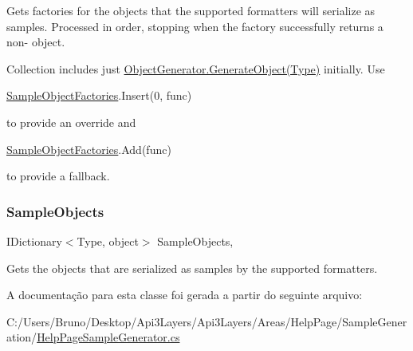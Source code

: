 Gets factories for the objects that the supported formatters will serialize as samples. Processed in order, stopping when the factory successfully returns a non-\/ object. 

Collection includes just \hyperlink{classApi3Layers_1_1Areas_1_1HelpPage_1_1ObjectGenerator_a5a661e03cac6c900f73a7e9e6e2d205d}{Object\+Generator.\+Generate\+Object(\+Type)} initially. Use 
\begin{DoxyCode}
\hyperlink{classApi3Layers_1_1Areas_1_1HelpPage_1_1HelpPageSampleGenerator_afe79b8cfae9329d64220589984337741}{SampleObjectFactories}.Insert(0, func)
\end{DoxyCode}
 to provide an override and 
\begin{DoxyCode}
\hyperlink{classApi3Layers_1_1Areas_1_1HelpPage_1_1HelpPageSampleGenerator_afe79b8cfae9329d64220589984337741}{SampleObjectFactories}.Add(func)
\end{DoxyCode}
 to provide a fallback.\mbox{\label{classApi3Layers_1_1Areas_1_1HelpPage_1_1HelpPageSampleGenerator_a74c69a35009188bdaff61af066b34aaa}} 
\subsubsection{\texorpdfstring{Sample\+Objects}{SampleObjects}}
{\footnotesize\ttfamily I\+Dictionary$<$Type, object$>$ Sample\+Objects\hspace{0.3cm}{\ttfamily [get]}, {\ttfamily [set]}}



Gets the objects that are serialized as samples by the supported formatters. 



A documentação para esta classe foi gerada a partir do seguinte arquivo\+:\begin{DoxyCompactItemize}
\item 
C\+:/\+Users/\+Bruno/\+Desktop/\+Api3\+Layers/\+Api3\+Layers/\+Areas/\+Help\+Page/\+Sample\+Generation/\hyperlink{HelpPageSampleGenerator_8cs}{Help\+Page\+Sample\+Generator.\+cs}\end{DoxyCompactItemize}
